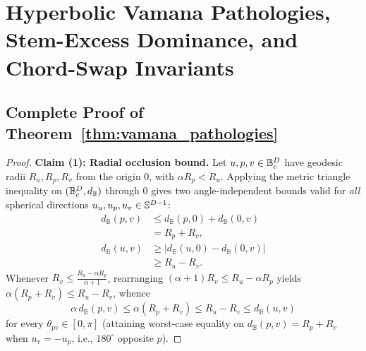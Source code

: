 \section{Hyperbolic Vamana Pathologies, Stem-Excess Dominance, and Chord-Swap Invariants}
\label{app:vamana_pathologies}

\subsection{Complete Proof of Theorem~\ref{thm:vamana_pathologies}}
\begin{proof}
\textbf{Claim (1): Radial occlusion bound.}
Let $u, p, v \in \mathbb{B}_c^D$ have geodesic radii $R_u, R_p, R_v$ from the origin $0$, with $\alpha R_p < R_u$.
Applying the metric triangle inequality on $(\mathbb{B}_c^D, d_{\mathbb{B}})$ through $0$ gives two angle-independent bounds valid for \emph{all} spherical directions $u_u, u_p, u_v \in \mathbb{S}^{D-1}$:
\begin{equation}
  \begin{aligned}
    d_{\mathbb{B}}(p, v) &\le d_{\mathbb{B}}(p, 0) + d_{\mathbb{B}}(0, v) \\
    &= R_p + R_v, \\
    d_{\mathbb{B}}(u, v) &\ge \bigl|d_{\mathbb{B}}(u, 0) - d_{\mathbb{B}}(0, v)\bigr| \\
    &\ge R_u - R_v.
  \end{aligned}
\end{equation}
Whenever $R_v \le \frac{R_u - \alpha R_p}{\alpha + 1}$, rearranging $(\alpha + 1)R_v \le R_u - \alpha R_p$ yields $\alpha(R_p + R_v) \le R_u - R_v$, whence
\begin{equation}
  \alpha\,d_{\mathbb{B}}(p, v) \le \alpha(R_p + R_v) \le R_u - R_v \le d_{\mathbb{B}}(u, v)
\end{equation}
for every $\theta_{pv} \in [0, \pi]$ (attaining worst-case equality on $d_{\mathbb{B}}(p, v) = R_p + R_v$ when $u_v = -u_p$, i.e., $180^\circ$ opposite $p$).


\end{proof}
